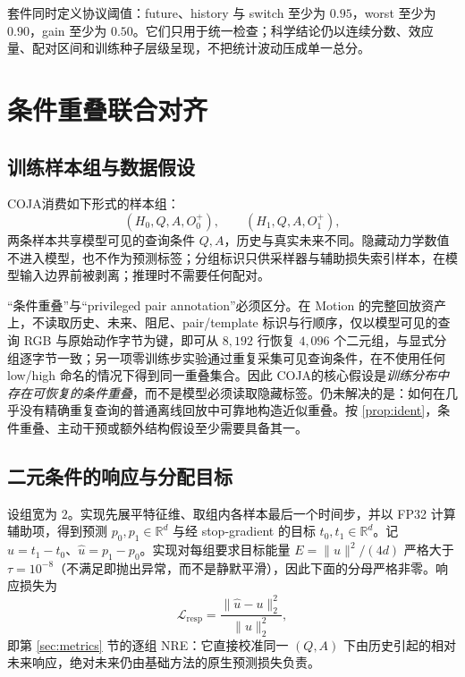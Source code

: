 \documentclass[UTF8,zihao=-4,fontset=fandol]{ctexart}
\newcommand{\method}{\textsc{COJA}}
\begin{document}
套件同时定义协议阈值：future、history 与 switch 至少为 $0.95$，worst 至少为 $0.90$，gain 至少为 $0.50$。它们只用于统一检查；科学结论仍以连续分数、效应量、配对区间和训练种子层级呈现，不把统计波动压成单一总分。

\section{条件重叠联合对齐}
\label{sec:coja}

\subsection{训练样本组与数据假设}

\method 消费如下形式的样本组：
\begin{equation}
  (H_0,Q,A,O_0^+),\qquad (H_1,Q,A,O_1^+),
\end{equation}
两条样本共享模型可见的查询条件 $Q,A$，历史与真实未来不同。隐藏动力学数值不进入模型，也不作为预测标签；分组标识只供采样器与辅助损失索引样本，在模型输入边界前被剥离；推理时不需要任何配对。

“条件重叠”与“privileged pair annotation”必须区分。在 Motion 的完整回放资产上，不读取历史、未来、阻尼、pair/template 标识与行顺序，仅以模型可见的查询 RGB 与原始动作字节为键，即可从 $8{,}192$ 行恢复 $4{,}096$ 个二元组，与显式分组逐字节一致；另一项零训练步实验通过重复采集可见查询条件，在不使用任何 low/high 命名的情况下得到同一重叠集合。因此 \method 的核心假设是\emph{训练分布中存在可恢复的条件重叠}，而不是模型必须读取隐藏标签。仍未解决的是：如何在几乎没有精确重复查询的普通离线回放中可靠地构造近似重叠。按 \cref{prop:ident}，条件重叠、主动干预或额外结构假设至少需要具备其一。

\subsection{二元条件的响应与分配目标}

设组宽为 $2$。实现先展平特征维、取组内各样本最后一个时间步，并以 FP32 计算辅助项，得到预测 $p_0,p_1\in\mathbb{R}^d$ 与经 stop-gradient 的目标 $t_0,t_1\in\mathbb{R}^d$。记 $u=t_1-t_0$、$\hat u=p_1-p_0$。实现对每组要求目标能量 $E=\lVert u\rVert^2/(4d)$ 严格大于 $\tau=10^{-8}$（不满足即抛出异常，而不是静默平滑），因此下面的分母严格非零。响应损失为
\begin{equation}
  \mathcal{L}_{\mathrm{resp}}=\frac{\lVert\hat u-u\rVert_2^2}{\lVert u\rVert_2^2},
\end{equation}
即第 \ref{sec:metrics} 节的逐组 NRE：它直接校准同一 $(Q,A)$ 下由历史引起的相对未来响应，绝对未来仍由基础方法的原生预测损失负责。
\end{document}
